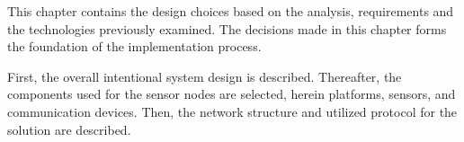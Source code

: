 \label{cha:designintro}

This chapter contains the design choices based on the analysis, requirements and the technologies previously examined. The decisions made in this chapter forms the foundation of the implementation process.

First, the overall intentional system design is described. Thereafter, the components used for the sensor nodes are selected, herein platforms, sensors, and communication devices.
Then, the network structure and utilized protocol for the solution are described.

